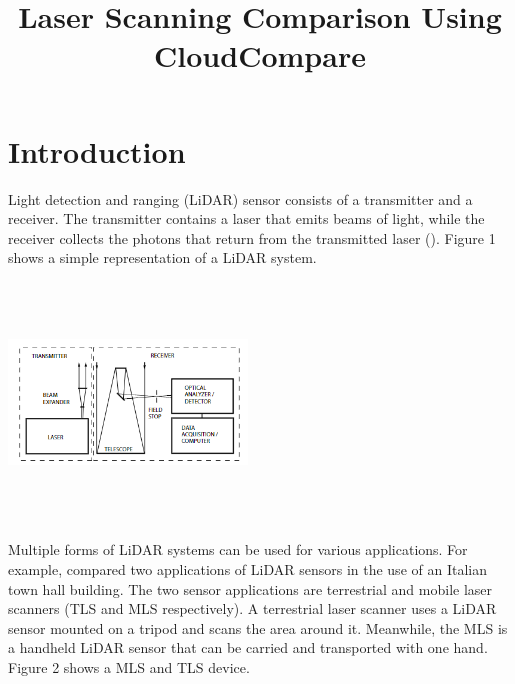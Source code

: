 \documentclass[man]{apa7}
\title{Laser Scanning Comparison Using CloudCompare}
\begin{document}
\maketitle
\vspace{-6em}
\section{Introduction\vspace{-5em}}

Light detection and ranging (LiDAR) sensor consists of a transmitter and a receiver. The transmitter contains a laser that emits beams of light, while the receiver collects the photons that return from the transmitted laser (\Textcite{wandinger2005}). Figure 1 shows a simple representation of a LiDAR system.

\begin{minipage}{\linewidth}
  \includegraphics[bb=0in 0in 2.5in 2.5in, height=2.5in, width=2.5in]{figures/lidarSetup.png}
  \label{fig:lidarSetup}
\end{minipage}

Multiple forms of LiDAR systems can be used for various applications. For example, \Textcite{conti2024} compared two applications of LiDAR sensors in the use of an Italian town hall building. The two sensor applications are terrestrial and mobile laser scanners (TLS and MLS respectively). A terrestrial laser scanner uses a LiDAR sensor mounted on a tripod and scans the area around it. Meanwhile, the MLS is a handheld LiDAR sensor that can be carried and transported with one hand. Figure 2 shows a MLS and TLS device.
\end{document}
